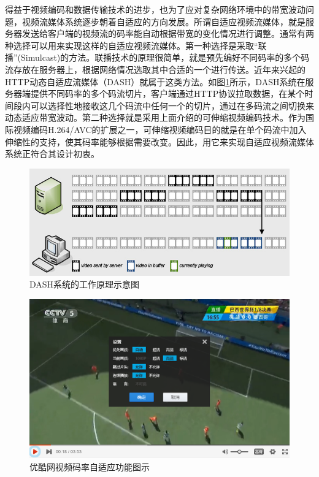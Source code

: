 得益于视频编码和数据传输技术的进步，也为了应对复杂网络环境中的带宽波动问题，视频流媒体系统逐步朝着自适应的方向发展。所谓自适应视频流媒体，就是服务器发送给客户端的视频流的码率能自动根据带宽的变化情况进行调整。通常有两种选择可以用来实现这样的自适应视频流媒体。第一种选择是采取“联播”(Simulcast)的方法。联播技术的原理很简单，就是预先编好不同码率的多个码流存放在服务器上，根据网络情况选取其中合适的一个进行传送。近年来兴起的HTTP动态自适应流媒体（DASH）\supercite{Sodagar2011}就属于这类方法。如图\ref{fig:12}所示，DASH系统在服务器端提供不同码率的多个码流切片，客户端通过HTTP协议拉取数据，在某个时间段内可以选择性地接收这几个码流中任何一个的切片，通过在多码流之间切换来动态适应带宽波动。第二种选择就是采用上面介绍的可伸缩视频编码技术。作为国际视频编码H.264/AVC的扩展之一，可伸缩视频编码目的就是在单个码流中加入伸缩性的支持，使其码率能够根据需要改变。因此，用它来实现自适应视频流媒体系统正符合其设计初衷。

\begin{figure}[h]
	\centering
	\includegraphics[width = 0.9\linewidth]{clip/12.png}
	\caption{DASH系统的工作原理示意图\label{fig:12}}
\end{figure}

\begin{figure}[h]
	\centering
	\includegraphics[width = 0.9\linewidth]{clip/13.png}
	\caption{优酷网视频码率自适应功能图示\label{fig:13}}
\end{figure}


